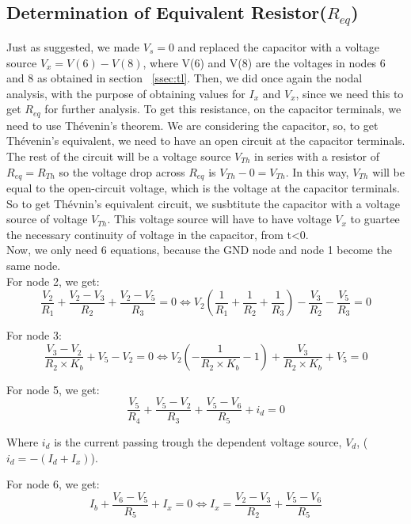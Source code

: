 \subsection{Determination of Equivalent Resistor($R_{eq}$)}
\label{ssec:R}
Just as suggested, we made $V_s = 0$ and replaced the capacitor with a voltage source $V_x= V(6)-V(8)$, where V(6) and V(8) are the voltages in nodes 6 and 8 as obtained in section ~\ref{ssec:tl}. Then, we did once again the nodal analysis, with the purpose of obtaining values for $I_x$ and $V_x$, since we need this to get $R_{eq}$ for further analysis. To get this resistance, on the capacitor terminals, we need to use Thévenin's theorem. We are considering the capacitor, so, to get Thévenin's equivalent, we need to have an open circuit at the capacitor terminals. The rest of the circuit will be a voltage source $V_{Th}$ in series with a resistor of $R_{eq}=R_{Th}$ so the voltage drop across $R_{eq}$ is  $V_{Th}-0= V_{Th}$. In this way,  $V_{Th}$ will be equal to the open-circuit voltage, which is the voltage at the capacitor terminals. So to get Thévnin's equivalent circuit, we susbtitute the capacitor with a voltage source of voltage $V_{Th}$. This voltage source will have to have voltage $V_x$ to guartee the necessary continuity of voltage in the capacitor, from t\textless0.\\
Now, we only need 6 equations, because the GND node and node 1 become the same node.\\
For node 2, we get:
\begin{equation}
\frac{V_2}{R_1} + \frac{V_2 - V_3}{R_2} + \frac{V_2 - V_5}{R_3} = 0 \Leftrightarrow V_2\left( \frac{1}{R_1} + \frac{1}{R_2} + \frac{1}{R_3} \right) - \frac{V_3}{R_2} - \frac{V_5}{R_3}=0
\end{equation}

For node 3:
\begin{equation}
\frac{V_3 - V_2}{R_2\times K_b }+ V_5 - V_2 = 0 \Leftrightarrow V_2 \left(-\frac{1}{R_2\times K_b} - 1\right) + \frac{V_3}{R_2\times K_b} + V_5 = 0
\end{equation}

For node 5, we get:
\begin{equation} \label{eqn:n5}
  \frac{V_5}{R_4}+ \frac{V_5-V_2}{R_3} + \frac{V_5-V_6}{R_5} + i_d= 0
\end{equation}

Where $i_d$ is the current passing trough the dependent voltage source, $V_d$, ($i_d = -(I_d + I_x)$).

For node 6, we get:
\begin{equation} \label{eqn:n6}
  I_b + \frac{V_6-V_5}{R_5} + I_x = 0 \Leftrightarrow I_x = \frac{V_2-V_3}{R_2} + \frac{V_5-V_6}{R_5}
\end{equation}

